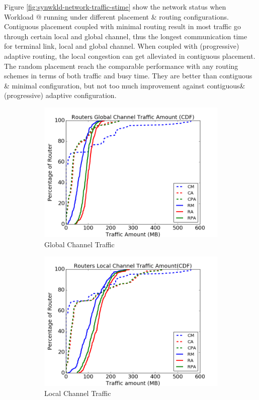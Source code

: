\documentclass[conference,compsoc]{IEEEtran}
\makeatletter
\newcommand{\Rmnum}[1]{\expandafter\@slowromancap\romannumeral #1@}
\makeatother
\begin{document}
Figure \ref{fig:synwkld-network-traffic-stime} show the network status when Workload \Rmnum{2} running under different placement \& routing configurations. Contiguous placement coupled with minimal routing result in most traffic go through certain local and global channel, thus the longest  communication time for terminal link, local and global channel. When coupled with (progressive) adaptive routing, the local congestion can get alleviated in contiguous placement. The random placement reach the comparable performance with any routing schemes in terms of both traffic and busy time. They are better than contiguous \& minimal configuration, but not too much improvement against contiguous\&(progressive) adaptive configuration.



\begin{figure}[t]
    \centering
    \begin{subfigure}[t]{0.32\textwidth}
        \centering
        \includegraphics[height=1.8 in]{syn-wkld/gc-traffic}
        \caption{Global Channel Traffic}
        \label{fig:synwkld-global-channel-traffic}
    \end{subfigure}\hfill
    \hspace{1em}%
    \begin{subfigure}[t]{0.32\textwidth}
        \centering
        \includegraphics[height=1.8 in]{syn-wkld/lc-traffic}
        \caption{Local Channel Traffic}
        \label{fig:synwkld-local-channel-traffic}
    \end{subfigure}\hfill
    \hspace{1em}%
    \begin{subfigure}[t]{0.32\textwidth}

\end{subfigure}
\end{figure}
\end{document}
